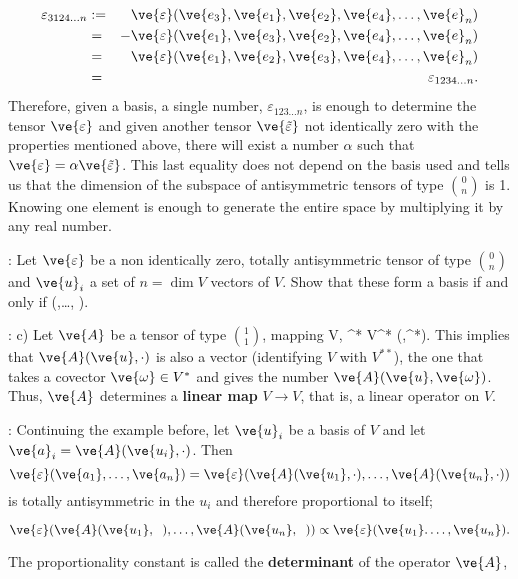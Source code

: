 \begin{eqnarray*} 
\varepsilon_{3124\ldots n} &:=& \ve{\varepsilon}(\ve{e_3},\ve{e_1}, \ve{e_{2}}, \ve{e_{4}},\ldots,\ve{e}_n) \\
&=& -\ve{\varepsilon}(\ve{e_1},\ve{e_3}, \ve{e_{2}}, \ve{e_{4}},\ldots,\ve{e}_n) \\ 
&=& \ve{\varepsilon}(\ve{e_1},\ve{e_2}, \ve{e_{3}}, \ve{e_{4}},\ldots,\ve{e}_n) \\
&=&\varepsilon_{1234\ldots n}. 
\end{eqnarray*} 
% 
Therefore, given a basis, a single number, $\varepsilon_{123\ldots n}$, is enough to determine the tensor $\ve{\varepsilon}$ and given another tensor $\ve{\tilde{\varepsilon} }$ not identically zero with the properties mentioned above, there will exist a number $\alpha$ such that $\ve{\varepsilon} = \alpha\ve{\tilde{\varepsilon}}$. 
This last equality does not depend on the basis used and tells us that the dimension of the subspace of antisymmetric tensors of type ${0 \choose n}$ is 1. Knowing one element is enough to generate the entire space by multiplying it by any real number.

\ejer: Let $\ve{\varepsilon}$ be a non identically zero, totally antisymmetric tensor of type ${0 \choose n}$ and ${\ve{u}_i}$ a set of $n=\dim V$ vectors of $V$. Show that these form a basis if and only if 
\beq 
\ve{\varepsilon} (,\ldots, ). 
\eeq

\ejem: c) Let $\ve{ A}$ be a tensor of type ${1 \choose 1}$, mapping
\beq
{}\in V, \;\; ^* \in V^* \to {}(,^*)\in\re. 
\eeq 
This implies that $\ve{A}(\ve{u},\cdot)$ is also a vector (identifying $V$ with $V^{**}$), the one that takes a covector $\ve{\omega} \in V^*$ and gives the number $\ve{A}(\ve{u},\ve{\omega})$. 
Thus, $\ve{A}$ determines a \textbf{linear map} $V \to V$, that is, a linear operator on $V$.

\ejer: Continuing the example before, let ${\ve{u}_i}$ be a basis of $V$ and let $\ve{ a}_i = \ve{A}(\ve{u_i},\cdot)$. Then \[ \ve{\varepsilon}(\ve{a_1},\ldots,\ve{a_n})=\ve{\varepsilon}(\ve{A}(\ve{u_1}, \cdot),\ldots ,\ve{A}(\ve{u_n},\cdot)) \] is totally antisymmetric in the ${u_i}$ and therefore proportional to itself;

\[ 
\ve{\varepsilon}(\ve{A}(\ve{u_1},\;\;),\ldots ,\ve{A}(\ve{u_n},\;\;)) \propto \ve{\varepsilon}(\ve{u_1}. \ldots, \ve{u_n}). 
\] %

The proportionality constant is called the {\bf determinant}  of the operator $\ve{A}$,

